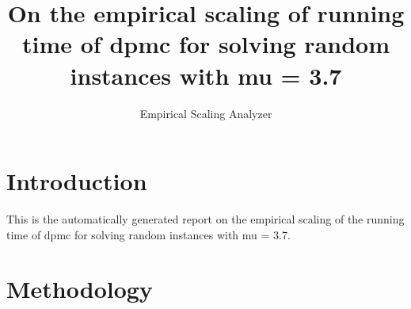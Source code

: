 \newcommand{\updatedYP}[1]{#1}
\newcommand{\yp}[1]{#1}
\newcommand{\orange}[1]{#1}
\newcommand{\evalModels}[1]{#1}
\newcommand{\bestBoot}[1]{#1}

\newcommand{\medianInterval}[1]{}
\newcommand{\randomizedAlgorithm}[1]{}
\newcommand{\quantileRegression}[1]{}
\renewcommand{\quantileRegression}[1]{#1}

\makeatletter

\providecommand{\tabularnewline}{\\}


\title{On the empirical scaling of running time of dpmc for solving random instances with mu = 3.7}
\author{Empirical Scaling Analyzer}

\makeatother

\usepackage{babel}

\maketitle %


\section{Introduction}

This is the automatically generated report on the empirical scaling
of the running time of dpmc for solving random instances with mu = 3.7.


\section{Methodology}

\label{sec:Methodology}


